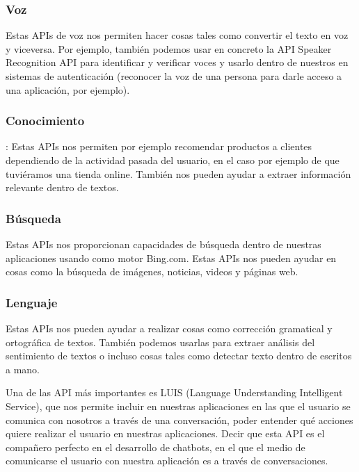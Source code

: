 \subsubsection{Voz} Estas APIs de voz nos permiten hacer cosas tales como convertir el texto
en voz y viceversa. Por ejemplo, también podemos usar en concreto la API Speaker Recognition
API para identificar y verificar voces y usarlo dentro de nuestros en sistemas de autenticación
(reconocer la voz de una persona para darle acceso a una aplicación, por ejemplo).

\subsubsection{Conocimiento}: Estas APIs nos permiten por ejemplo recomendar productos a
clientes dependiendo de la actividad pasada del usuario, en el caso por ejemplo de que
tuviéramos una tienda online. También nos pueden ayudar a extraer información relevante dentro
de textos.

\subsubsection{Búsqueda} Estas APIs nos proporcionan capacidades de búsqueda dentro de nuestras
aplicaciones usando como motor Bing.com. Estas APIs nos pueden ayudar en cosas como la búsqueda
de imágenes, noticias, videos y páginas web.

\subsubsection{Lenguaje} Estas APIs nos pueden ayudar a realizar cosas como corrección
gramatical y ortográfica de textos. También podemos usarlas para extraer análisis del
sentimiento de textos o incluso cosas tales como detectar texto dentro de escritos a mano.

Una de las API más importantes es LUIS (Language Understanding Intelligent Service), que nos permite incluir en nuestras aplicaciones en las que el usuario se comunica con nosotros a través de una conversación, poder entender qué acciones quiere realizar el usuario en nuestras aplicaciones. Decir que esta API es el compañero perfecto en el desarrollo de chatbots, en el que el medio de comunicarse el usuario con nuestra aplicación es a través de conversaciones.

